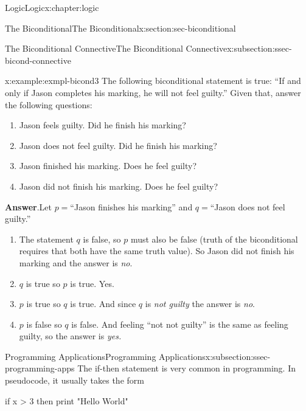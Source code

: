 \documentclass[twoside,10pt,]{book}
\newcommand{\blocktitlefont}{\relax}
\numberwithin{equation}{section}
\begin{document}
\begin{chapterptx}{Logic}{}{Logic}{}{}{x:chapter:logic}
\begin{sectionptx}{The Biconditional}{}{The Biconditional}{}{}{x:section:sec-biconditional}
\begin{subsectionptx}{The Biconditional Connective}{}{The Biconditional Connective}{}{}{x:subsection:ssec-bicond-connective}
 \begin{example}{}{x:example:exmpl-bicond3}%
The following biconditional statement is true: ``If and only if Jason completes his marking, he will not feel guilty.''  Given that, answer the following questions: %
\begin{enumerate}
\item{}Jason feels guilty.  Did he finish his marking?%
\item{}Jason does not feel guilty.  Did he finish his marking?%
\item{}Jason finished his marking.  Does he feel guilty?%
\item{}Jason did not finish his marking.  Does he feel guilty?%
\end{enumerate}
\par\smallskip%
\noindent\textbf{\blocktitlefont Answer}.\label{g:answer:idp229593944}{}\hypertarget{g:answer:idp229593944}{}\quad{}Let \(p=\)``Jason finishes his marking'' and \(q=\)``Jason does not feel guilty.''%
\begin{enumerate}
\item{}The statement \(q\) is false, so \(p\) must also be false (truth of the biconditional requires that both have the same truth value). So Jason did not finish his marking and the answer is \emph{no}.%
\item{}\(q\) is true so \(p\) is true.  Yes.%
\item{}\(p\) is true so \(q\) is true.  And since \(q\) is \emph{not guilty} the answer is \emph{no}.%
\item{}\(p\) is false so \(q\) is false. And feeling ``not not guilty'' is the same as feeling guilty, so the answer is \emph{yes.}%
\end{enumerate}
\end{example}
%
\end{subsectionptx}
%
%
\typeout{************************************************}
\typeout{************************************************}
%
\begin{subsectionptx}{Programming Applications}{}{Programming Applications}{}{}{x:subsection:ssec-programming-apps}
The if-then statement is very common in programming.  In pseudocode, it usually takes the form%
\begin{codedisplay}

              if x > 3 then print "Hello World"
            

\end{codedisplay}
\end{subsectionptx}
\end{sectionptx}
\end{chapterptx}
\end{document}
